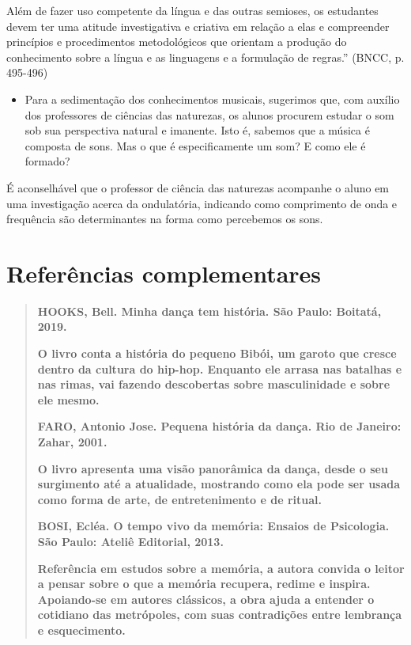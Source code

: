 \documentclass[12pt]{extarticle}
\begin{document}
Além de fazer uso competente da língua e das outras semioses, os
estudantes devem ter uma atitude investigativa e criativa em relação a
elas e compreender princípios e procedimentos metodológicos que orientam
a produção do conhecimento sobre a língua e as linguagens e a formulação
de regras.'' (BNCC, p. 495-496)

\begin{itemize}
\item
  Para a sedimentação dos conhecimentos musicais, sugerimos que, com
  auxílio dos professores de ciências das naturezas, os alunos procurem
  estudar o som sob sua perspectiva natural e imanente. Isto é, sabemos
  que a música é composta de sons. Mas o que é especificamente um som? E
  como ele é formado?
\end{itemize}

É aconselhável que o professor de ciência das naturezas acompanhe o
aluno em uma investigação acerca da ondulatória, indicando como
comprimento de onda e frequência são determinantes na forma como
percebemos os sons.


\section{Referências complementares}

\begin{quote} \textbf{HOOKS, Bell. Minha dança tem história. São Paulo:
  Boitatá, 2019.}

\textbf{O livro conta a história do pequeno Bibói, um garoto que cresce dentro
  da cultura do hip-hop. Enquanto ele arrasa nas batalhas e nas rimas, vai
  fazendo descobertas sobre masculinidade e sobre ele mesmo.}

\textbf{FARO, Antonio Jose. Pequena história da dança. Rio de Janeiro: Zahar,
  2001.}

\textbf{O livro apresenta uma visão panorâmica da dança, desde o seu surgimento
  até a atualidade, mostrando como ela pode ser usada como forma de arte, de
  entretenimento e de ritual.}

\textbf{BOSI, Ecléa. O tempo vivo da memória: Ensaios de Psicologia. São Paulo:
  Ateliê Editorial, 2013.}

\textbf{Referência em estudos sobre a memória, a autora convida o leitor a
  pensar sobre o que a memória recupera, redime e inspira. Apoiando-se em
  autores clássicos, a obra ajuda a entender o cotidiano das metrópoles, com
  suas contradições entre lembrança e esquecimento.} \end{quote}
\end{document}
